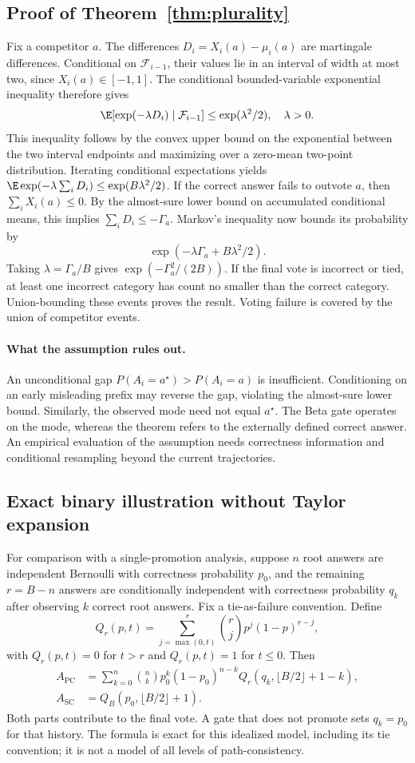\subsection{Proof of Theorem~\ref{thm:plurality}}
Fix a competitor $a$. The differences $D_i=X_i(a)-\mu_i(a)$ are martingale differences. Conditional on $\mathcal F_{i-1}$, their values lie in an interval of width at most two, since $X_i(a)\in[-1,1]$. The conditional bounded-variable exponential inequality therefore gives
\[
 \E[\exp(-\lambda D_i)\mid\mathcal F_{i-1}]\leq\exp(\lambda^2/2),\quad \lambda>0.
\]
This inequality follows by the convex upper bound on the exponential between the two interval endpoints and maximizing over a zero-mean two-point distribution. Iterating conditional expectations yields
$\E\exp(-\lambda\sum_iD_i)\leq\exp(B\lambda^2/2)$.
If the correct answer fails to outvote $a$, then $\sum_iX_i(a)\leq0$. By the almost-sure lower bound on accumulated conditional means, this implies $\sum_iD_i\leq-\Gamma_a$. Markov's inequality now bounds its probability by
\[
 \exp(-\lambda\Gamma_a+B\lambda^2/2).
\]
Taking $\lambda=\Gamma_a/B$ gives $\exp(-\Gamma_a^2/(2B))$. If the final vote is incorrect or tied, at least one incorrect category has count no smaller than the correct category. Union-bounding these events proves the result. Voting failure is covered by the union of competitor events.

\paragraph{What the assumption rules out.}
An unconditional gap $P(A_i=a^\star)>P(A_i=a)$ is insufficient. Conditioning on an early misleading prefix may reverse the gap, violating the almost-sure lower bound. Similarly, the observed mode need not equal $a^\star$. The Beta gate operates on the mode, whereas the theorem refers to the externally defined correct answer. An empirical evaluation of the assumption needs correctness information and conditional resampling beyond the current trajectories.

\subsection{Exact binary illustration without Taylor expansion}
For comparison with a single-promotion analysis, suppose $n$ root answers are independent Bernoulli with correctness probability $p_0$, and the remaining $r=B-n$ answers are conditionally independent with correctness probability $q_k$ after observing $k$ correct root answers. Fix a tie-as-failure convention. Define
\[
 Q_r(p,t)=\sum_{j=\max(0,t)}^r \binom{r}{j}p^j(1-p)^{r-j},
\]
with $Q_r(p,t)=0$ for $t>r$ and $Q_r(p,t)=1$ for $t\leq0$. Then
\begin{align}
 A_{\mathrm{PC}}&=\sum_{k=0}^{n}\binom{n}{k}p_0^k(1-p_0)^{n-k}
       Q_r(q_k,\lfloor B/2\rfloor+1-k),\label{eq:exactbinary}\\
 A_{\mathrm{SC}}&=Q_B(p_0,\lfloor B/2\rfloor+1).
\end{align}
Both parts contribute to the final vote. A gate that does not promote sets $q_k=p_0$ for that history. The formula is exact for this idealized model, including its tie convention; it is not a model of all levels of path-consistency.

